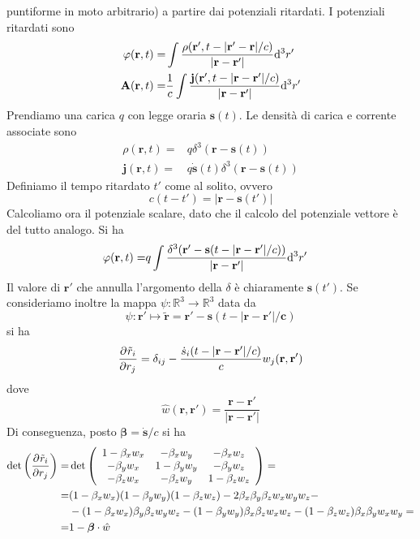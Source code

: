 \documentclass{article}
\renewcommand{\vec}[1]{\mathbf{#1}}
\begin{document}
\begin{enumerate}
{		puntiforme in moto arbitrario) a partire dai potenziali ritardati.}
		I potenziali ritardati sono
		\begin{align*}
			\varphi(\vec{r},t)=&\int\frac{\rho(\vec{r}',t-|\vec{r}'-\vec{r}|/c)}{|\vec{r}-\vec{r}'|}\d ^3r'\\\vec{A}(\vec{r},t)=&\frac{1}{c}\int\frac{\vec{j}(\vec{r}',t-|\vec{r}-\vec{r}'|/c)}{|\vec{r}-\vec{r}'|}\d ^3r'
		\end{align*}
		Prendiamo una carica $q$ con legge oraria $\vec{s}(t)$. Le densità di carica e corrente associate sono
		\begin{align*}
			\rho(\vec{r},t)=&q\delta^3(\vec{r}-\vec{s}(t))\\\vec{j}(\vec{r},t)=&q\dot{\vec{s}}(t)\delta^3(\vec{r}-\vec{s}(t))
		\end{align*}
		Definiamo il tempo ritardato $t'$ come al solito, ovvero
		\[c(t-t')=|\vec{r}-\vec{s}(t')|\]
		Calcoliamo ora il potenziale scalare, dato che il calcolo del potenziale vettore è del tutto analogo. 
		Si ha
		\begin{align*}
			\varphi(\vec{r},t)=&q\int\frac{\delta^3(\vec{r}'-\vec{s}(t-|\vec{r}-\vec{r}'|/c))}{|\vec{r}-\vec{r}'|}\d ^3r'
		\end{align*}
		Il valore di $\vec{r}'$ che annulla l'argomento della $\delta$ è chiaramente $\vec{s}(t')$. Se consideriamo inoltre la mappa $\psi\colon\mathbb{R}^3\to\mathbb{R}^3$ data da
		\[\psi:\vec{r}'\mapsto\tilde{\vec{r}}=\vec{r}'-\vec{s}(t-|\vec{r}-\vec{r'|/c})\]
		si ha
		\[\pder{\tilde{r}_i}{r_j}=\delta_{ij}-\frac{\dot{s}_i(t-|\vec{r}-\vec{r}'|/c)}{c}w_j(\vec{r},\vec{r}')\]
		dove
		\[\hat{w}(\vec{r},\vec{r}')=\frac{\vec{r}-\vec{r}'}{|\vec{r}-\vec{r}'|}\]
		Di conseguenza, posto $\bm{\beta}=\dot{\vec{s}}/c$ si ha
		\begin{align*}
			\det\left(\dfrac{\partial ^{}\tilde{r}_i}{\partial {r_j}^{}}\right)=&\det\left(\begin{array}{c c c}
			1-\beta_xw_x&-\beta_xw_y&-\beta_xw_z\\-\beta_yw_x&1-\beta_yw_y&-\beta_yw_z\\-\beta_zw_x&-\beta_zw_y&1-\beta_zw_z
			\end{array}\right)=\\=&(1-\beta_xw_x)(1-\beta_yw_y)(1-\beta_zw_z)-2\beta_x\beta_y\beta_zw_xw_yw_z-\\&-(1-\beta_xw_x)\beta_y\beta_zw_yw_z-(1-\beta_yw_y)\beta_x\beta_zw_xw_z-(1-\beta_zw_z)\beta_x\beta_yw_xw_y=\\=&1-\bm{\beta}\cdot\hat{w}
		\end{align*}

\end{enumerate}
\end{document}
